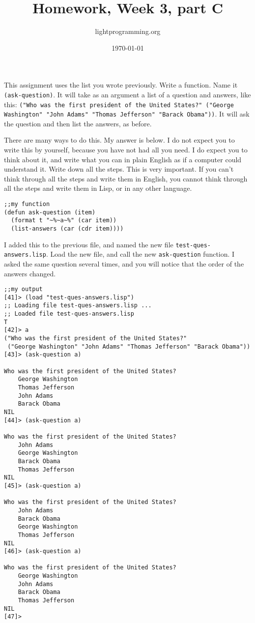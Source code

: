 \documentclass{article}
\title{Homework, Week 3, part C}
\author{lightprogramming.org}
\date{\today}
\begin{document}
\maketitle{}

This assignment uses the list you wrote previously. Write a function. Name it \texttt{(ask-question)}. It will take as an argument a list of a question and answers, like this: \texttt{("Who was the first president of the United States?" ("George Washington" "John Adams" "Thomas Jefferson" "Barack Obama"))}. It will ask the question and then list the answers, as before.

There are many ways to do this. My answer is below. I do not expect you to write this by yourself, because you have not had all you need. I do expect you to think about it, and write what you can in plain English as if a computer could understand it. Write down all the steps. This is very important. If you can't think through all the steps and write them in English, you cannot think through all the steps and write them in Lisp, or in any other language.

\lstset{language=Lisp,numbers=left,keepspaces=false,basicstyle=\small,numberstyle=\tiny,breaklines=true,showstringspaces=false}
\begin{lstlisting}[caption = My function]
;;my function
(defun ask-question (item)
  (format t "~%~a~%" (car item))
  (list-answers (car (cdr item))))
\end{lstlisting}

I added this to the previous file, and named the new file \texttt{test-ques-answers.lisp}. Load the new file, and call the new \texttt{ask-question} function. I asked the same question several times, and you will notice that the order of the answers changed.

\lstset{language=Lisp,numbers=left,keepspaces=false,basicstyle=\small,numberstyle=\tiny,breaklines=true,showstringspaces=false}
\begin{lstlisting}[captionb = My output]
;;my output
[41]> (load "test-ques-answers.lisp")
;; Loading file test-ques-answers.lisp ...
;; Loaded file test-ques-answers.lisp
T
[42]> a
("Who was the first president of the United States?"
 ("George Washington" "John Adams" "Thomas Jefferson" "Barack Obama"))
[43]> (ask-question a)

Who was the first president of the United States?
    George Washington
    Thomas Jefferson
    John Adams
    Barack Obama
NIL
[44]> (ask-question a)

Who was the first president of the United States?
    John Adams
    George Washington
    Barack Obama
    Thomas Jefferson
NIL
[45]> (ask-question a)

Who was the first president of the United States?
    John Adams
    Barack Obama
    George Washington
    Thomas Jefferson
NIL
[46]> (ask-question a)

Who was the first president of the United States?
    George Washington
    John Adams
    Barack Obama
    Thomas Jefferson
NIL
[47]>
\end{lstlisting}
\end{document}

